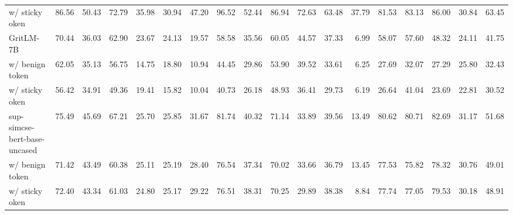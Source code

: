 \begin{tabular}{lrrrrrrrrrrrrrrrrr}
w/ sticky oken & 86.56 & 50.43 & 72.79 & 35.98 & 30.94 & 47.20 & 96.52 & 52.44 & 86.94 & 72.63 & 63.48 & 37.79 & 81.53 & 83.13 & 86.00 & 30.84 & 63.45 \\
GritLM-7B & 70.44 & 36.03 & 62.90 & 23.67 & 24.13 & 19.57 & 58.58 & 35.56 & 60.05 & 44.57 & 37.33 & 6.99 & 58.07 & 57.60 & 48.32 & 24.11 & 41.75 \\
w/ benign token & 62.05 & 35.13 & 56.75 & 14.75 & 18.80 & 10.94 & 44.45 & 29.86 & 53.90 & 39.52 & 33.61 & 6.25 & 27.69 & 32.07 & 27.29 & 25.80 & 32.43 \\
w/ sticky oken & 56.42 & 34.91 & 49.36 & 19.41 & 15.82 & 10.04 & 40.73 & 26.18 & 48.93 & 36.41 & 29.73 & 6.19 & 26.64 & 41.04 & 23.69 & 22.81 & 30.52 \\
sup-simcse-bert-base-uncased & 75.49 & 45.69 & 67.21 & 25.70 & 25.85 & 31.67 & 81.74 & 40.32 & 71.14 & 33.89 & 39.56 & 13.49 & 80.62 & 80.71 & 82.69 & 31.17 & 51.68 \\
w/ benign token & 71.42 & 43.49 & 60.38 & 25.11 & 25.19 & 28.40 & 76.54 & 37.34 & 70.02 & 33.66 & 36.79 & 13.45 & 77.53 & 75.82 & 78.32 & 30.76 & 49.01 \\
w/ sticky oken & 72.40 & 43.34 & 61.03 & 24.80 & 25.17 & 29.22 & 76.51 & 38.31 & 70.25 & 29.89 & 38.38 & 8.84 & 77.74 & 77.05 & 79.53 & 30.18 & 48.91 \\
\bottomrule
\end{tabular}
